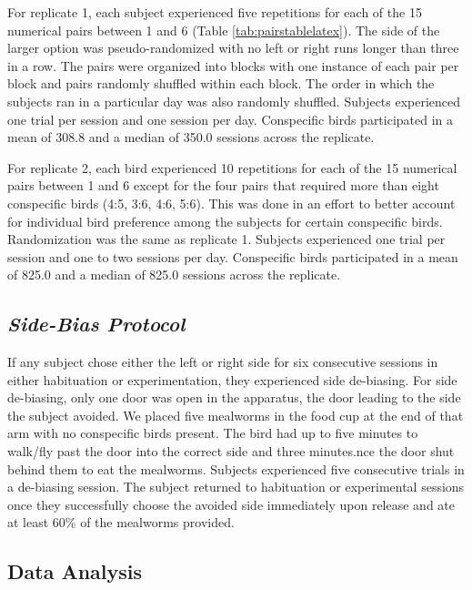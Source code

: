 \documentclass[
  ,pub,floatsintext]{apa6}
\begin{document}
For replicate 1, each subject experienced five repetitions for each of the 15 numerical pairs between 1 and 6 (Table \ref{tab:pairstablelatex}). The side of the larger option was pseudo-randomized with no left or right runs longer than three in a row. The pairs were organized into blocks with one instance of each pair per block and pairs randomly shuffled within each block. The order in which the subjects ran in a particular day was also randomly shuffled. Subjects experienced one trial per session and one session per day. Conspecific birds participated in a mean of 308.8 and a median of 350.0 sessions across the replicate.

For replicate 2, each bird experienced 10 repetitions for each of the 15 numerical pairs between 1 and 6 except for the four pairs that required more than eight conspecific birds (4:5, 3:6, 4:6, 5:6). This was done in an effort to better account for individual bird preference among the subjects for certain conspecific birds. Randomization was the same as replicate 1. Subjects experienced one trial per session and one to two sessions per day. Conspecific birds participated in a mean of 825.0 and a median of 825.0 sessions across the replicate.

\hypertarget{side-bias-protocol-1}{%
\subsection{\texorpdfstring{\emph{Side-Bias Protocol}}{Side-Bias Protocol}}\label{side-bias-protocol-1}}

If any subject chose either the left or right side for six consecutive sessions in either habituation or experimentation, they experienced side de-biasing. For side de-biasing, only one door was open in the apparatus, the door leading to the side the subject avoided. We placed five mealworms in the food cup at the end of that arm with no conspecific birds present. The bird had up to five minutes to walk/fly past the door into the correct side and three minutes.nce the door shut behind them to eat the mealworms. Subjects experienced five consecutive trials in a de-biasing session. The subject returned to habituation or experimental sessions once they successfully choose the avoided side immediately upon release and ate at least 60\% of the mealworms provided.

\hypertarget{data-analysis}{%
\subsection{Data Analysis}\label{data-analysis}}
\end{document}
